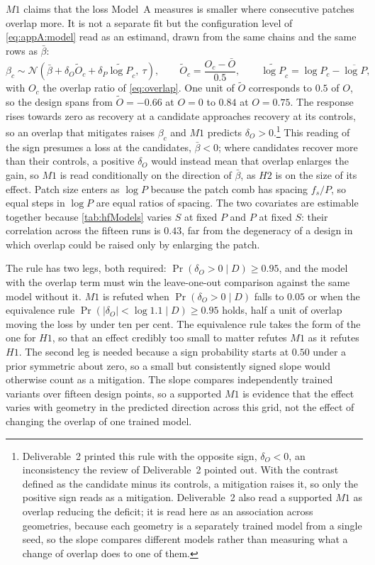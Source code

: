 $M1$ claims that the loss Model~A measures is smaller where consecutive patches overlap more. It is not a separate fit but the configuration level of \autoref{eq:appA:model} read as an estimand, drawn from the same chains and the same rows as $\bar\beta$:
\begin{equation}
\label{eq:appM1:model}
\beta_c \sim \mathcal{N}\!\left(\bar\beta + \delta_O \widetilde O_c + \delta_P \widetilde{\log P}_c,\ \tau\right),
\qquad
\widetilde O_c=\frac{O_c-\bar O}{0.5},
\qquad
\widetilde{\log P}_c=\log P_c-\overline{\log P},
\end{equation}
with $O_c$ the overlap ratio of \autoref{eq:overlap}. One unit of $\widetilde O$ corresponds to $0.5$ of $O$, so the design spans from $\widetilde O=-0.66$ at $O=0$ to $0.84$ at $O=0.75$. The response rises towards zero as recovery at a candidate approaches recovery at its controls, so an overlap that mitigates raises $\beta_c$ and $M1$ predicts $\delta_O>0$.\footnote{Deliverable~2 printed this rule with the opposite sign, $\delta_O<0$, an inconsistency the review of Deliverable~2 pointed out. With the contrast defined as the candidate minus its controls, a mitigation raises it, so only the positive sign reads as a mitigation. Deliverable~2 also read a supported $M1$ as overlap reducing the deficit; it is read here as an association across geometries, because each geometry is a separately trained model from a single seed, so the slope compares different models rather than measuring what a change of overlap does to one of them.} This reading of the sign presumes a loss at the candidates, $\bar\beta<0$; where candidates recover more than their controls, a positive $\delta_O$ would instead mean that overlap enlarges the gain, so $M1$ is read conditionally on the direction of $\bar\beta$, as $H2$ is on the size of its effect. Patch size enters as $\log P$ because the patch comb has spacing $f_s/P$, so equal steps in $\log P$ are equal ratios of spacing. The two covariates are estimable together because \autoref{tab:hfModels} varies $S$ at fixed $P$ and $P$ at fixed $S$: their correlation across the fifteen runs is $0.43$, far from the degeneracy of a design in which overlap could be raised only by enlarging the patch.

The rule has two legs, both required: $\Pr(\delta_O>0\mid D)\ge0.95$, and the model with the overlap term must win the leave-one-out comparison against the same model without it. $M1$ is refuted when $\Pr(\delta_O>0\mid D)$ falls to $0.05$ or when the equivalence rule $\Pr(|\delta_O|<\log1.1\mid D)\ge0.95$ holds, half a unit of overlap moving the loss by under ten per cent. The equivalence rule takes the form of the one for $H1$, so that an effect credibly too small to matter refutes $M1$ as it refutes $H1$. The second leg is needed because a sign probability starts at $0.50$ under a prior symmetric about zero, so a small but consistently signed slope would otherwise count as a mitigation. The slope compares independently trained variants over fifteen design points, so a supported $M1$ is evidence that the effect varies with geometry in the predicted direction across this grid, not the effect of changing the overlap of one trained model.

